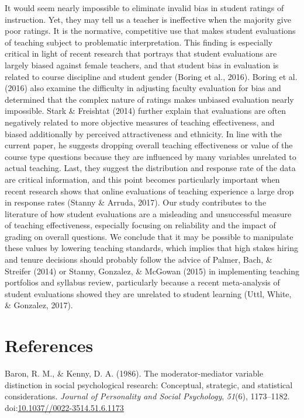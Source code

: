 \documentclass[,man]{apa6}
\theoremstyle{definition}
\theoremstyle{definition}
\theoremstyle{definition}
\theoremstyle{remark}
\begin{document}
It would seem nearly impossible to eliminate invalid bias in student
ratings of instruction. Yet, they may tell us a teacher is ineffective
when the majority give poor ratings. It is the normative, competitive
use that makes student evaluations of teaching subject to problematic
interpretation. This finding is especially critical in light of recent
research that portrays that student evaluations are largely biased
against female teachers, and that student bias in evaluation is related
to course discipline and student gender (Boring et al., 2016). Boring et
al. (2016) also examine the difficulty in adjusting faculty evaluation
for bias and determined that the complex nature of ratings makes
unbiased evaluation nearly impossible. Stark \& Freishtat (2014) further
explain that evaluations are often negatively related to more objective
measures of teaching effectiveness, and biased additionally by perceived
attractiveness and ethnicity. In line with the current paper, he
suggests dropping overall teaching effectiveness or value of the course
type questions because they are influenced by many variables unrelated
to actual teaching. Last, they suggest the distribution and response
rate of the data are critical information, and this point becomes
particularly important when recent research shows that online
evaluations of teaching experience a large drop in response rates
(Stanny \& Arruda, 2017). Our study contributes to the literature of how
student evaluations are a misleading and unsuccessful measure of
teaching effectiveness, especially focusing on reliability and the
impact of grading on overall questions. We conclude that it may be
possible to manipulate these values by lowering teaching standards,
which implies that high stakes hiring and tenure decisions should
probably follow the advice of Palmer, Bach, \& Streifer (2014) or
Stanny, Gonzalez, \& McGowan (2015) in implementing teaching portfolios
and syllabus review, particularly because a recent meta-analysis of
student evaluations showed they are unrelated to student learning (Uttl,
White, \& Gonzalez, 2017).

\newpage

\section{References}\label{references}

\setlength{\parindent}{-0.5in} \setlength{\leftskip}{0.5in}

\hypertarget{refs}{}
\hypertarget{ref-Baron1986}{}
Baron, R. M., \& Kenny, D. A. (1986). The moderator-mediator variable
distinction in social psychological research: Conceptual, strategic, and
statistical considerations. \emph{Journal of Personality and Social
Psychology}, \emph{51}(6), 1173--1182.
doi:\href{https://doi.org/10.1037//0022-3514.51.6.1173}{10.1037//0022-3514.51.6.1173}
\end{document}
